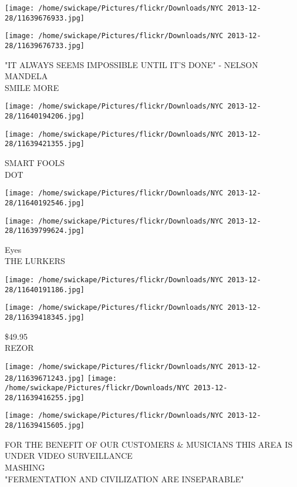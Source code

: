 \documentclass[10pt,letterpaper]{article}
\begin{document}
\texttt{[image: /home/swickape/Pictures/flickr/Downloads/NYC 2013-12-28/11639676933.jpg]}

\vspace{0.25in}
\texttt{[image: /home/swickape/Pictures/flickr/Downloads/NYC 2013-12-28/11639676733.jpg]}

"IT ALWAYS SEEMS IMPOSSIBLE UNTIL IT'S DONE" {-} NELSON MANDELA\\
SMILE MORE
\pagebreak

\texttt{[image: /home/swickape/Pictures/flickr/Downloads/NYC 2013-12-28/11640194206.jpg]}

\vspace{0.25in}
\texttt{[image: /home/swickape/Pictures/flickr/Downloads/NYC 2013-12-28/11639421355.jpg]}

SMART FOOLS\\
DOT
\pagebreak

\texttt{[image: /home/swickape/Pictures/flickr/Downloads/NYC 2013-12-28/11640192546.jpg]}

\vspace{0.25in}
\texttt{[image: /home/swickape/Pictures/flickr/Downloads/NYC 2013-12-28/11639799624.jpg]}

Eyes\\
THE LURKERS
\pagebreak

\texttt{[image: /home/swickape/Pictures/flickr/Downloads/NYC 2013-12-28/11640191186.jpg]}

\vspace{0.25in}
\texttt{[image: /home/swickape/Pictures/flickr/Downloads/NYC 2013-12-28/11639418345.jpg]}

\$49.95\\
REZOR
\pagebreak

\texttt{[image: /home/swickape/Pictures/flickr/Downloads/NYC 2013-12-28/11639671243.jpg]}
\texttt{[image: /home/swickape/Pictures/flickr/Downloads/NYC 2013-12-28/11639416255.jpg]}

\vspace{0.25in}
\texttt{[image: /home/swickape/Pictures/flickr/Downloads/NYC 2013-12-28/11639415605.jpg]}

FOR THE BENEFIT OF OUR CUSTOMERS \& MUSICIANS THIS AREA IS UNDER VIDEO SURVEILLANCE\\
MASHING\\
"FERMENTATION AND CIVILIZATION ARE INSEPARABLE"
\pagebreak
\end{document}
